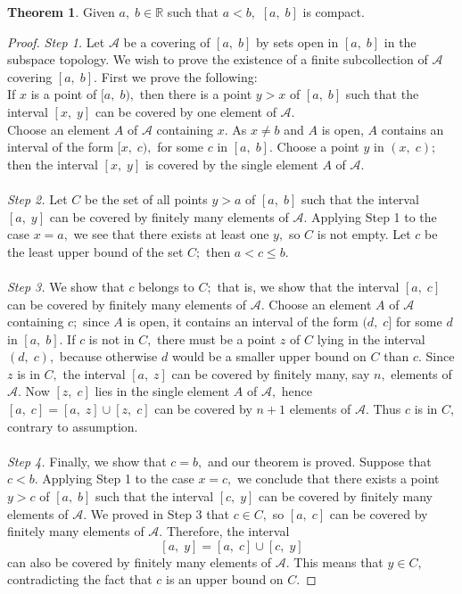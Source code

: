 \documentclass{article}
\theoremstyle{definition}
\newtheorem{theorem}{Theorem}[section]
\begin{document}
%
\begin{theorem}
  Given $a,\;b\in\mathbb{R}$ such that $a < b,$ $[a,\;b]$ is compact.
\end{theorem}
\begin{proof}
  \emph{Step 1.} Let $\mathcal{A}$ be a covering of $[a,\;b]$ by sets open in $[a,\;b]$ in the subspace topology. We wish to prove the existence of a finite subcollection of $\mathcal{A}$ covering $[a,\;b].$ First we prove the following:\\
  If $x$ is a point of $[a,\;b),$ then there is a point $y > x$ of $[a,\;b]$ such that the interval $[x,\;y]$ can be covered by one element of $\mathcal{A}.$\\
  Choose an element $A$ of $\mathcal{A}$ containing $x.$ As $x \neq b$ and $A$ is open, $A$ contains an interval of the form $[x,\;c),$ for some $c$ in $[a,\;b].$ Choose a point $y$ in $(x,\;c);$ then the interval $[x,\;y]$ is covered by the single element $A$ of $\mathcal{A}.$\\~\\
  \emph{Step 2.} Let $C$ be the set of all points $y > a$ of $[a,\;b]$ such that the interval $[a,\;y]$ can be covered by finitely many elements of $\mathcal{A}.$ Applying Step 1 to the case $x = a,$ we  see that there exists at least one $y,$ so $C$ is not empty. Let $c$ be the least upper bound of the set $C;$ then $a < c \le b.$\\\\
  \emph{Step 3.} We show that $c$ belongs to $C;$ that is, we show that the interval $[a,\;c]$ can be covered by finitely many elements of $\mathcal{A}.$ Choose an element $A$ of $\mathcal{A}$ containing $c;$ since $A$ is open, it contains an interval of the form $(d,\;c]$ for some $d$ in $[a,\;b].$ If $c$ is not in $C,$ there must be a point $z$ of $C$ lying in the interval $(d,\;c),$ because otherwise $d$ would be a smaller upper bound on $C$ than $c.$ Since $z$ is in $C,$ the interval $[a,\;z]$ can be covered by finitely many, say $n,$ elements of $\mathcal{A}.$ Now $[z,\;c]$ lies in the single element $A$ of $\mathcal{A},$ hence $[a,\;c] = [a,\;z]\cup[z,\;c]$ can be covered by $n + 1$ elements of $\mathcal{A}.$ Thus $c$ is in $C,$ contrary to assumption.\\\\
  \emph{Step 4.} Finally, we show that $c = b,$ and our theorem is proved. Suppose that $c < b.$ Applying Step 1 to the case $x = c,$ we conclude that there exists a point $y  > c$ of $[a,\;b]$ such that the interval $[c,\;y]$ can be covered by finitely many elements of $\mathcal{A}.$ We proved in Step 3 that $c \in C,$ so $[a,\;c]$ can be covered by finitely many elements of $\mathcal{A}.$ Therefore, the interval
  \[[a,\;y] = [a,\;c] \cup [c,\;y]\]
  can also be covered by finitely many elements of $\mathcal{A}.$ This means that $y \in C,$ contradicting the fact that $c$ is an upper bound on $C.$ 
\end{proof}
\end{document}
